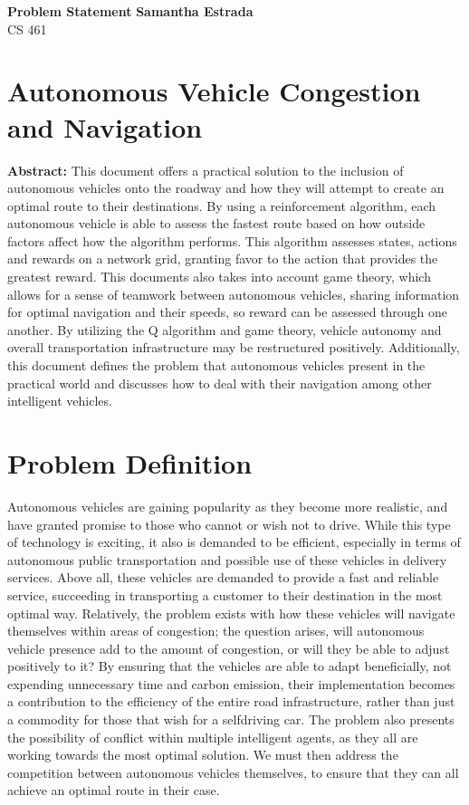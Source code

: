 \documentclass[a4paper, 11pt]{article}
\begin{document}
\noindent
\large\textbf{Problem Statement} \hfill \textbf{Samantha Estrada} \\
\normalsize CS 461 \hfill

\section*{Autonomous Vehicle Congestion and Navigation}
 \textbf{Abstract:}   This	document offers	a	practical	solution	to	the	inclusion	of	autonomous	vehicles	onto	the	roadway	and	
how	they	will	attempt	to	create	an	optimal	route	to	their	destinations.	By	using	a	reinforcement	algorithm,	each	
autonomous	vehicle	is	able	to assess	the	fastest	route	based	on	how	outside	factors	affect	how	the	algorithm	
performs. This	algorithm	assesses	states,	actions	and	rewards	on	a	network	grid,	granting	favor	to	the	action	that	
provides	the greatest	reward.	This	documents	also	takes	into	account	game	theory,	which	allows	for	a	sense	of	
teamwork	between	autonomous	vehicles,	sharing	information	for	optimal	navigation and	their	speeds,	so	reward	
can	be assessed	through	one	another. By	utilizing	the	Q	algorithm	and	game	theory,	vehicle	autonomy	and	overall	
transportation	infrastructure	may	be	restructured	positively. Additionally,	this	document defines	the	problem	that	
autonomous	vehicles	present	in	the	practical	world and	discusses	how	to	deal	with	their	navigation	among	other	
intelligent	vehicles.	

\section*{Problem Definition}
Autonomous	vehicles	are	gaining	popularity	as	they	become more	realistic,	and	have	granted	promise	to	
those	who	cannot	or	wish	not	to	drive.	While	this	type	of	technology	is	exciting,	it	also	is	demanded	to	be	efficient,	
especially	in	terms	of	autonomous	public	transportation	and	possible	use	of	these	vehicles	in	delivery	services.	
Above	all,	these	vehicles	are	demanded	to	provide	a	fast	and	reliable	service,	succeeding in	transporting	a	
customer	to	their	destination	in	the	most	optimal	way. Relatively,	the	problem	exists	with	how	these	vehicles	will	
navigate	themselves	within	areas	of	congestion;	the	question	arises,	will	autonomous	vehicle	presence add	to	the	
amount of	congestion,	or	will	they	be	able	to	adjust	positively to	it? By	ensuring	that	the	vehicles	are	able	to	adapt	
beneficially,	not expending	unnecessary time	and	carbon emission,	their implementation	becomes	a	contribution	
to	the	efficiency	of	the	entire	road	infrastructure, rather	than	just	a	commodity	for	those	that	wish	for	a	selfdriving
car.	The	problem	also	presents	the	possibility	of	conflict	within	multiple	intelligent	agents,	as	they	all	are	
working	towards	the	most	optimal	solution.	We	must	then	address	the	competition	between	autonomous	vehicles	
themselves,	to	ensure	that	they	can	all	achieve	an	optimal	route	in	their	case.	
\end{document}
